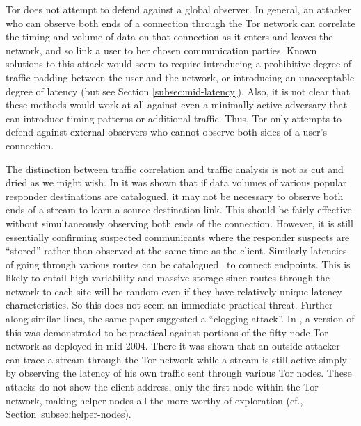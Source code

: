 \documentclass{llncs}
\begin{document}
Tor does not attempt to defend against a global observer.  In general, an
attacker who can observe both ends of a connection through the Tor network
can correlate the timing and volume of data on that connection as it enters
and leaves the network, and so link a user to her chosen communication
parties.  Known solutions to this attack would seem to require introducing a
prohibitive degree of traffic padding between the user and the network, or
introducing an unacceptable degree of latency (but see Section
\ref{subsec:mid-latency}).  Also, it is not clear that these methods would
work at all against even a minimally active adversary that can introduce timing
patterns or additional traffic.  Thus, Tor only attempts to defend against
external observers who cannot observe both sides of a user's connection.

The distinction between traffic correlation and traffic analysis is
not as cut and dried as we might wish. In \cite{hintz-pet02} it was
shown that if data volumes of various popular
responder destinations are catalogued, it may not be necessary to
observe both ends of a stream to learn a source-destination link.
This should be fairly effective without simultaneously observing both
ends of the connection. However, it is still essentially confirming
suspected communicants where the responder suspects are ``stored'' rather
than observed at the same time as the client.
Similarly latencies of going through various routes can be
catalogued~\cite{back01} to connect endpoints.
This is likely to entail high variability and massive storage since
%
routes through the network to each site will be random even if they
have relatively unique latency characteristics. So this does not seem
an immediate practical threat. Further along similar lines, the same
paper suggested a ``clogging attack''. In \cite{attack-tor-oak05}, a
version of this was demonstrated to be practical against portions of
the fifty node Tor network as deployed in mid 2004. There it was shown
that an outside attacker can trace a stream through the Tor network
while a stream is still active simply by observing the latency of his
own traffic sent through various Tor nodes. These attacks do not show
the client address, only the first node within the Tor network, making
helper nodes all the more worthy of exploration (cf.,
Section~{subsec:helper-nodes}).
\end{document}
